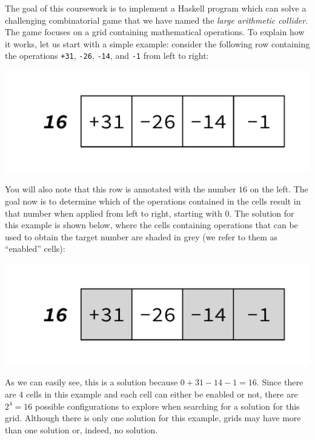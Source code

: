 The goal of this coursework is to implement a Haskell program which can solve a challenging combinatorial game that we have named the \emph{large arithmetic collider}. The game focuses on a grid containing mathematical operations. To explain how it works, let us start with a simple example: consider the following row containing the operations \texttt{+31}, \texttt{-26}, \texttt{-14}, and \texttt{-1} from left to right:
\begin{center}
	\includegraphics[scale=0.4,trim=0 30 0 30]{cswk/lac1.pdf}
\end{center}
You will also note that this row is annotated with the number $16$ on the left. The goal now is to determine which of the operations contained in the cells result in that number when applied from left to right, starting with $0$. The solution for this example is shown below, where the cells containing operations that can be used to obtain the target number are shaded in grey (we refer to them as ``enabled'' cells):
\begin{center}
	\includegraphics[scale=0.4,trim=0 30 0 30]{cswk/lac1s.pdf}
\end{center}
As we can easily see, this is a solution because $0+31-14-1=16$. Since there are 4 cells in this example and each cell can either be enabled or not, there are $2^4=16$ possible configurations to explore when searching for a solution for this grid. Although there is only one solution for this example, grids may have more than one solution or, indeed, no solution. 

